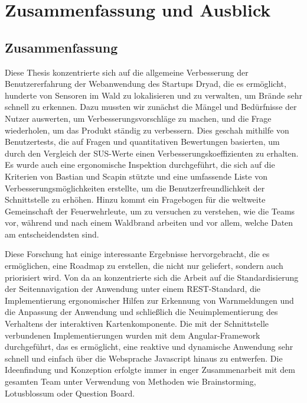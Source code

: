 \chapter{Zusammenfassung und Ausblick} \label{chap:conclusion}

\section{Zusammenfassung}

Diese Thesis konzentrierte sich auf die allgemeine Verbesserung der Benutzererfahrung der Webanwendung des Startups Dryad, die es ermöglicht, hunderte von Sensoren im Wald zu lokalisieren und zu verwalten, um Brände sehr schnell zu erkennen.
Dazu mussten wir zunächst die Mängel und Bedürfnisse der Nutzer auswerten, um Verbesserungsvorschläge zu machen, und die Frage wiederholen, um das Produkt ständig zu verbessern.
Dies geschah mithilfe von Benutzertests, die auf Fragen und quantitativen Bewertungen basierten, um durch den Vergleich der \ac{SUS}-Werte einen Verbesserungskoeffizienten zu erhalten.
Es wurde auch eine ergonomische Inspektion durchgeführt, die sich auf die Kriterien von Bastian und Scapin stützte und eine umfassende Liste von Verbesserungsmöglichkeiten erstellte, um die Benutzerfreundlichkeit der Schnittstelle zu erhöhen.
Hinzu kommt ein Fragebogen für die weltweite Gemeinschaft der Feuerwehrleute, um zu versuchen zu verstehen, wie die Teams vor, während und nach einem Waldbrand arbeiten und vor allem, welche Daten am entscheidendsten sind.

Diese Forschung hat einige interessante Ergebnisse hervorgebracht, die es ermöglichen, eine Roadmap zu erstellen, die nicht nur geliefert, sondern auch priorisiert wird.
Von da an konzentrierte sich die Arbeit auf die Standardisierung der Seitennavigation der Anwendung unter einem REST-Standard, die Implementierung ergonomischer Hilfen zur Erkennung von Warnmeldungen und die Anpassung der Anwendung und schließlich die Neuimplementierung des Verhaltens der interaktiven Kartenkomponente.
Die mit der Schnittstelle verbundenen Implementierungen wurden mit dem Angular-Framework durchgeführt, das es ermöglicht, eine reaktive und dynamische Anwendung sehr schnell und einfach über die Websprache Javascript hinaus zu entwerfen.
Die Ideenfindung und Konzeption erfolgte immer in enger Zusammenarbeit mit dem gesamten Team unter Verwendung von Methoden wie Brainstorming, Lotusblossum oder Question Board.

